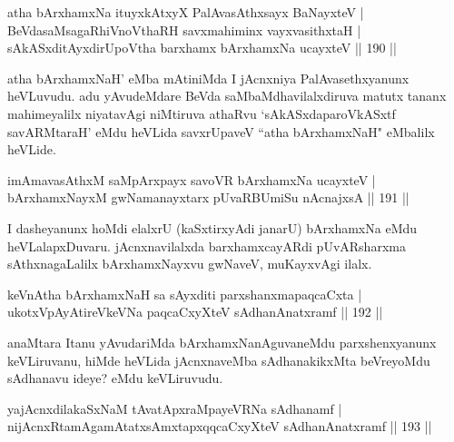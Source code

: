 \begin{shl}
atha bArxhamxNa ituyxkAtxyX PalAvasAthx\s sayx BaNayxteV |\\
BeVdasaMsagaRhiVnoV\s thaRH savxmahiminx vayxvasithxtaH |\\
sAkASxditAyxdirUpoV\s tha barxhamx bArxhamxNa ucayxteV \hfill || 190 ||
\end{shl}

\begin{artha}
atha bArxhamxNaH' eMba mAtiniMda I jAcnxniya PalAvasethxyanunx heVLuvudu. adu yAvudeMdare BeVda saMbaMdhavilalxdiruva matutx tananx mahimeyalilx niyatavAgi niMtiruva athaRvu `sAkASxdaparoVkASxtf savARMtaraH' eMdu heVLida savxrUpaveV ``atha bArxhamxNaH" eMbalilx heVLide.
\end{artha}


\begin{shl}
imAmavasAthxM saMpArxpayx savoVR bArxhamxNa ucayxteV |\\
bArxhamxNayxM gwNamanayxtarx pUvaRBUmiSu nAcnajxsA \hfill || 191 ||
\end{shl}

\begin{artha}
I dasheyanunx hoMdi elalxrU (kaSxtirxyAdi janarU) bArxhamxNa eMdu heVLalapxDuvaru. jAcnxnavilalxda barxhamxcayARdi pUvARsharxma sAthxnagaLalilx bArxhamxNayxvu gwNaveV, muKayxvAgi ilalx.
\end{artha}


\begin{shl}
keVnAtha bArxhamxNaH sa sAyxditi parxshanxmapaqcaCxta |\\
ukotxVpAyAtireVkeVNa paqcaCxyXteV sAdhanAnatxramf \hfill || 192 ||
\end{shl}

\begin{artha}
anaMtara Itanu yAvudariMda bArxhamxNanAguvaneMdu parxshenxyanunx keVLiruvanu, hiMde heVLida jAcnxnaveMba sAdhanakikxMta beVreyoMdu sAdhanavu ideye? eMdu keVLiruvudu.
\end{artha}


\begin{shl}
yajAcnxdilakaSxNaM tAvatApxraMpayeVRNa sAdhanamf |\\
nijAcnxRtamAgamAtatxsAmxtapxqqcaCxyXteV sAdhanAnatxramf \hfill || 193 ||
\end{shl}

